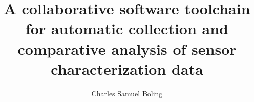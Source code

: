 \documentclass{msumastersthesis}
\title{A collaborative software toolchain for
  automatic collection and comparative analysis of sensor
  characterization data}
\author{Charles Samuel Boling}
\begin{document}
\frontmatter
\maketitlepage

\TOC
\listoffigures

% 

\mainmatter
\begin{doublespace}





\end{doublespace}




\backmatter
\printglossaries
\printbibliography[heading=bibintoc]
\end{document}

